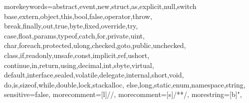 {morekeywords={abstract,event,new,struct,as,explicit,null,switch
          base,extern,object,this,bool,false,operator,throw,
          break,finally,out,true,byte,fixed,override,try,
          case,float,params,typeof,catch,for,private,uint,
          char,foreach,protected,ulong,checked,goto,public,unchecked,
          class,if,readonly,unsafe,const,implicit,ref,ushort,
          continue,in,return,using,decimal,int,sbyte,virtual,
          default,interface,sealed,volatile,delegate,internal,short,void,
          do,is,sizeof,while,double,lock,stackalloc,
          else,long,static,enum,namespace,string},
    sensitive=false,
    morecomment=[l]{//},
    morecomment=[s]{/*}{*/},
    morestring=[b]",
}

